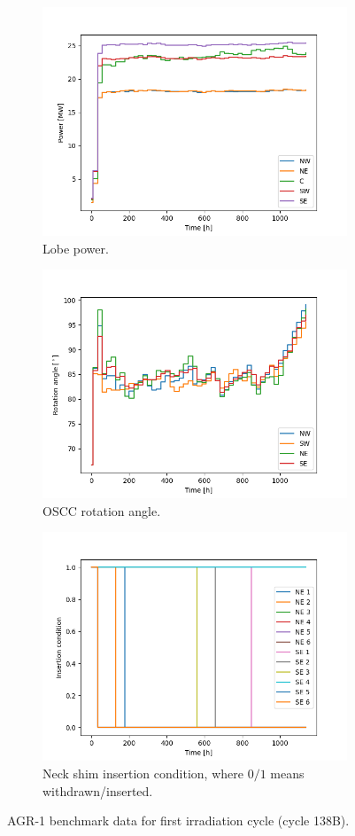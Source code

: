 \begin{figure}[htbp!] %
  \centering
  \begin{subfigure}{1\textwidth}
    \centering
    \includegraphics[width=0.55\linewidth]{figures/power_cycle_138B}
    \caption{Lobe power.}
    \label{fig:agrd-a}
  \end{subfigure}
  \begin{subfigure}{1\textwidth}
    \centering
    \includegraphics[width=0.55\linewidth]{figures/oscc_cycle_138B}
    \caption{OSCC rotation angle.}
    \label{fig:agrd-b}
  \end{subfigure}
  \begin{subfigure}{1\textwidth}
    \centering
    \includegraphics[width=0.55\linewidth]{figures/neck_cycle_138B}
    \caption{Neck shim insertion condition, where $0/1$ means withdrawn/inserted.}
    \label{fig:agrd-c}
  \end{subfigure}
  \caption[benchmark]{AGR-1 benchmark data for first irradiation cycle (cycle 138B).}
  \label{fig:agr-data}
\end{figure}


